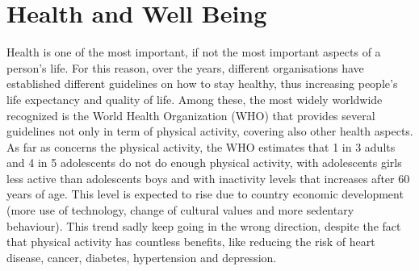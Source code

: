 \setcounter{section}{0}
\section{Health and Well Being}
Health is one of the most important, if not the most important aspects of a person's life. For this reason, over the years, different organisations have established different guidelines on how to stay healthy, thus increasing people's life expectancy and quality of life. Among these, the most widely worldwide recognized is the World Health Organization (WHO) \cite{Who} that provides several guidelines not only in term of physical activity, covering also other health aspects. \newline As far as concerns the physical activity, the WHO estimates that 1 in 3 adults and 4 in 5 adolescents do not do enough physical activity, with adolescents girls less active than adolescents boys and with inactivity levels that increases after 60 years of age. This level is expected to rise due to country economic development (more use of technology, change of cultural values and more sedentary behaviour). This trend sadly keep going in the wrong direction, despite the fact that physical activity has countless benefits, like reducing the risk of heart disease, cancer, diabetes, hypertension and depression.
